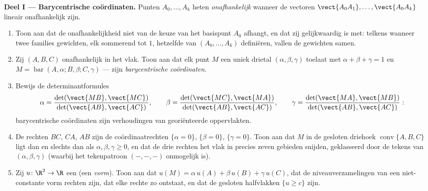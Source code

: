 \begin{problem}
\medskip
\noindent\textbf{Deel I --- Barycentrische coördinaten.} Punten
$A_0, \dots, A_k$ heten \emph{ onafhankelijk} wanneer de
vectoren $\vect{A_0A_1}, \dots, \vect{A_0A_k}$ lineair
onafhankelijk zijn.
\begin{enumerate}
  \item Toon aan dat de  onafhankelijkheid niet van de
        keuze van het basispunt $A_0$ afhangt, en dat zij
        gelijkwaardig is met: telkens wanneer twee families
        gewichten, elk sommerend tot $1$, hetzelfde 
        van $(A_0, \dots, A_k)$ definiëren, vallen de gewichten
        samen.
  \item Zij $(A, B, C)$  onafhankelijk in het vlak. Toon aan
        dat elk punt $M$ een uniek drietal $(\alpha, \beta,
        \gamma)$ toelaat met $\alpha + \beta + \gamma = 1$ en $M =
        \operatorname{bar}(A, \alpha; B, \beta; C, \gamma)$ ---
        zijn \emph{barycentrische coördinaten}.
  \item Bewijs de determinantformules
        \[
        \alpha = \frac{\det(\vect{MB},
        \vect{MC})}{\det(\vect{AB}, \vect{AC})},
        \qquad
        \beta = \frac{\det(\vect{MC},
        \vect{MA})}{\det(\vect{AB}, \vect{AC})},
        \qquad
        \gamma = \frac{\det(\vect{MA},
        \vect{MB})}{\det(\vect{AB}, \vect{AC})} :
        \]
        barycentrische coördinaten zijn verhoudingen van
        georiënteerde oppervlakten.
  \item De rechten $BC$, $CA$, $AB$ zijn de coördinaatrechten
        $\{\alpha = 0\}$, $\{\beta = 0\}$, $\{\gamma = 0\}$. Toon
        aan dat $M$ in de gesloten driehoek $\operatorname{conv}\{A,
        B, C\}$ ligt dan en slechts dan als $\alpha, \beta, \gamma
        \geq 0$, en dat de drie rechten het vlak in precies zeven
        gebieden snijden, geklasseerd door de tekens van $(\alpha,
        \beta, \gamma)$ (waarbij het tekenpatroon $(-, -, -)$
        onmogelijk is).
  \item Zij $u \colon \R^2 \to \R$ een  (een
        \emph{ vorm}). Toon aan dat $u(M) = \alpha\,u(A) +
        \beta\,u(B) + \gamma\,u(C)$, dat de niveauverzamelingen
        van een niet-constante  vorm rechten zijn, dat elke
        rechte zo ontstaat, en dat de gesloten halfvlakken $\{u
        \geq c\}$  zijn.
\end{enumerate}


\end{problem}
